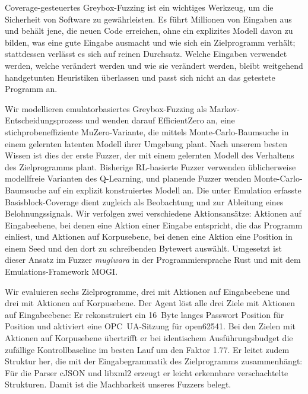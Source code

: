 



Coverage-gesteuertes Greybox-Fuzzing ist ein wichtiges Werkzeug, um die Sicherheit von Software zu
gewährleisten.
Es führt Millionen von Eingaben aus und behält jene, die neuen Code erreichen, ohne ein explizites
Modell davon zu bilden, was eine gute Eingabe ausmacht und wie sich ein Zielprogramm verhält;
stattdessen verlässt es sich auf reinen Durchsatz.
Welche Eingaben verwendet werden, welche verändert werden und wie sie verändert werden, bleibt
weitgehend handgetunten Heuristiken überlassen und passt sich nicht an das getestete Programm an.

Wir modellieren emulatorbasiertes Greybox-Fuzzing als Markov-Entscheidungsprozess und wenden darauf
EfficientZero an, eine stichprobeneffiziente MuZero-Variante, die mittels Monte-Carlo-Baumsuche in
einem gelernten latenten Modell ihrer Umgebung plant.
Nach unserem besten Wissen ist dies der erste Fuzzer, der mit einem gelernten Modell des Verhaltens
des Zielprogramms plant.
Bisherige RL-basierte Fuzzer verwenden üblicherweise modellfreie Varianten des Q-Learning, und
planende Fuzzer wenden Monte-Carlo-Baumsuche auf ein explizit konstruiertes Modell an.
Die unter Emulation erfasste Basisblock-Coverage dient zugleich als Beobachtung und zur Ableitung
eines Belohnungssignals.
Wir verfolgen zwei verschiedene Aktionsansätze: Aktionen auf Eingabeebene, bei denen eine Aktion einer Eingabe
entspricht, die das Programm einliest, und Aktionen auf Korpusebene, bei denen eine Aktion eine
Position in einem Seed und den dort zu schreibenden Bytewert auswählt.
Umgesetzt ist dieser Ansatz im Fuzzer \emph{mugiwara} in der Programmiersprache Rust und mit dem
Emulations-Framework MOGI.

Wir evaluieren sechs Zielprogramme, drei mit Aktionen auf Eingabeebene und drei mit Aktionen auf
Korpusebene.
Der Agent löst alle drei Ziele mit Aktionen auf Eingabeebene: Er rekonstruiert ein 16~Byte langes
Passwort Position für Position und aktiviert eine OPC~UA-Sitzung für open62541.
Bei den Zielen mit Aktionen auf Korpusebene übertrifft er bei identischem Ausführungsbudget die
zufällige Kontrollbaseline im besten Lauf um den Faktor \num{1.77}.
Er leitet zudem Struktur her, die mit der Eingabegrammatik des Zielprogramms zusammenhängt: Für die
Parser cJSON und libxml2 erzeugt er leicht erkennbare verschachtelte Strukturen.
Damit ist die Machbarkeit unseres Fuzzers belegt.


